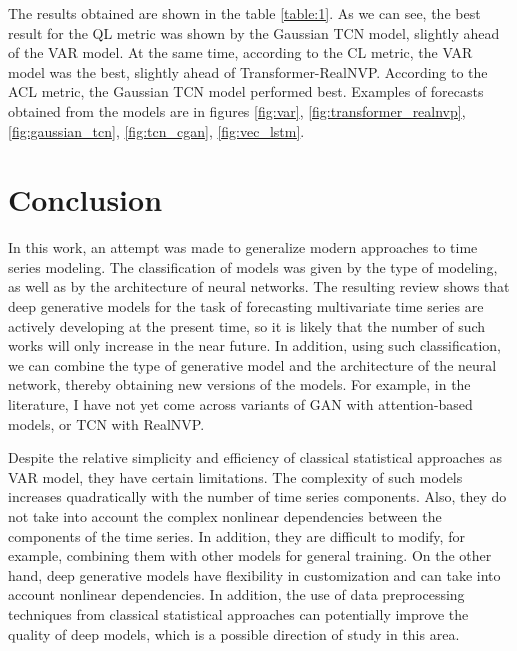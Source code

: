 \documentclass[12pt,a4paper]{article}
\begin{document}
The results obtained are shown in the table \ref{table:1}. As we can see, the best result for the QL metric was shown by the Gaussian TCN model, slightly ahead of the VAR model. At the same time, according to the CL metric, the VAR model was the best, slightly ahead of Transformer-RealNVP. According to the ACL metric, the Gaussian TCN model performed best. Examples of forecasts obtained from the models are in figures \ref{fig:var}, \ref{fig:transformer_realnvp}, \ref{fig:gaussian_tcn}, \ref{fig:tcn_cgan}, \ref{fig:vec_lstm}.

\section{Conclusion}

In this work, an attempt was made to generalize modern approaches to time series modeling. The classification of models was given by the type of modeling, as well as by the architecture of neural networks. The resulting review shows that deep generative models for the task of forecasting multivariate time series are actively developing at the present time, so it is likely that the number of such works will only increase in the near future. In addition, using such classification, we can combine the type of generative model and the architecture of the neural network, thereby obtaining new versions of the models. For example, in the literature, I have not yet come across variants of GAN with attention-based models, or TCN with RealNVP.

Despite the relative simplicity and efficiency of classical statistical approaches as VAR model, they have certain limitations. The complexity of such models increases quadratically with the number of time series components. Also, they do not take into account the complex nonlinear dependencies between the components of the time series. In addition, they are difficult to modify, for example, combining them with other models for general training. On the other hand, deep generative models have flexibility in customization and can take into account nonlinear dependencies. In addition, the use of data preprocessing techniques from classical statistical approaches can potentially improve the quality of deep models, which is a possible direction of study in this area.


\end{document}

